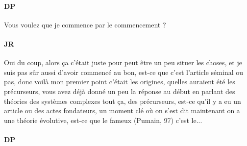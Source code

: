 \documentclass[12pt]{article}
\begin{document}
\paragraph{DP}

Vous voulez que je commence par le commencement ?


\paragraph{JR}

Oui du coup, alors ça c'était juste pour peut être un peu situer les choses, et je suis pas sûr aussi d'avoir commencé au bon, est-ce que c'est l'article séminal ou pas, donc voilà mon premier point c'était les origines, quelles auraient été les précurseurs, vous avez déjà donné un peu la réponse au début en parlant des théories des systèmes complexes tout ça, des précurseurs, est-ce qu'il y a eu un article ou des actes fondateurs, un moment clé où on s'est dit maintenant on a une théorie évolutive, est-ce que le fameux (Pumain, 97) c'est le...

\paragraph{DP}
\end{document}
